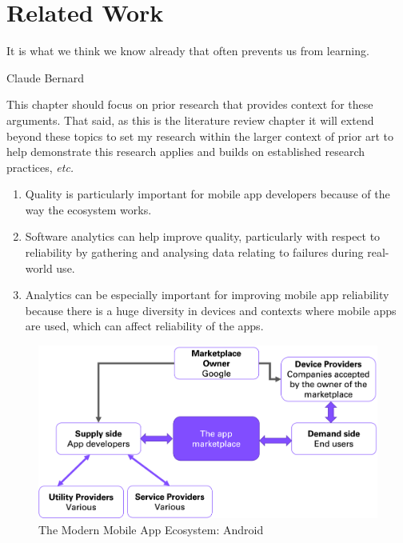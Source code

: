 \setchapterpreamble[u]{\margintoc}
\chapter{Related Work}
\label{chapter-related-work}
\epigraph{It is what we think we know already that often prevents us from learning.}{Claude Bernard} %


\bigskip
\bigskip %

\begin{kaobox}[frametitle=Context for this chapter]
This chapter should focus on prior research that provides context for these arguments. That said, as this is the literature review chapter it will extend beyond these topics to set my research within the larger context of prior art to help demonstrate this research applies and builds on established research practices, \emph{etc.}

\begin{enumerate}[start=3]
    \item Quality is particularly important for mobile app developers because of the way the ecosystem works.
    \item Software analytics can help improve quality, particularly with respect to reliability by gathering and analysing data relating to failures during real-world use.
    \item Analytics can be especially important for improving mobile app reliability because there is a huge diversity in devices and contexts where mobile apps are used, which can affect reliability of the apps.
\end{enumerate}
\end{kaobox}


\begin{figure}[b!]
    \centering
    \includegraphics[width=0.9\linewidth]{images/my/android-app-ecosystem-main-players.png}
    \caption{The Modern Mobile App Ecosystem: Android}
    \label{fig:my_modern-mobile-app-ecosystem}
\end{figure}

